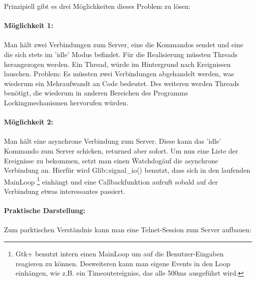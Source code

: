 Prinzipiell gibt es drei Möglichkeiten dieses Problem zu lösen:\ \\ \\
\textbf{Möglichkeit 1:}\ \\ \\
Man hält zwei Verbindungen zum Server, eine die Kommandos sendet und eine die sich stets im 'idle' Modus befindet.
Für die Realisierung müssten Threads herangezogen werden. Ein Thread, würde im Hintergrund nach Ereignissen lauschen.
Problem: Es müssten zwei Verbindungen abgehandelt werden, was wiederum ein Mehraufwandt an Code bedeutet. Des weiteren
werden Threads benötigt, die wiederum in anderen Bereichen des Programms Lockingmechanismen hervorufen würden.\ \\ \\
\textbf{Möglichkeit 2:}\ \\ \\
Man hält eine asynchrone Verbindung zum Server. Diese kann das 'idle' Kommando zum Server schicken, returned aber sofort.
Um nun eine Liste der Ereignisse zu bekommen, setzt man einen \"Watchdog\" auf die asynchrone Verbindung an. Hierfür wird
Glib::signal\_io() benutzt, dass sich in den laufenden MainLoop \footnote{Gtk+ benutzt intern einen MainLoop um auf die 
Benutzer-Eingaben reagieren zu können. Desweiteren kann man eigene Events in den Loop einhängen, wie z.B. ein Timeoutereigniss,
das alle 500ms ausgeführt wird.} einhängt und eine Callbackfunktion aufruft sobald auf der Verbindung etwas interessantes 
passiert.\ \\ \\
\textbf{Praktische Darstellung:}\ \\ \\
Zum parktischen Verständnis kann man eine Telnet-Session zum Server aufbauen:
